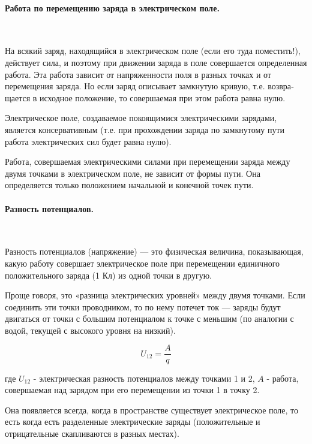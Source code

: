 \documentclass[a4paper,12pt]{article}
\begin{document}
		\paragraph{Работа по перемещению заряда в электрическом поле.} \
		
		На всякий заряд, находящийся в электрическом поле (если его туда поместить!), дей­ствует
		сила, и поэтому при движении заряда в поле совер­шается определенная работа. Эта работа 
		зависит от напря­женности поля в разных точках и от перемещения заряда. Но если заряд 
		описывает замкнутую кривую, т.е. возвра­щается в исходное положение, то совершаемая при 
		этом работа равна нулю.

		Электрическое поле, создаваемое покоящимися электрическими зарядами, является 
		консервативным (т.е. при прохождении заряда по замкнутому пути работа электрических сил
		будет равна нулю).

		Работа, совершаемая электрическими силами при перемещении заряда между двумя точками 
		в электрическом поле, не зависит от формы пути. Она определяется только положением 
		начальной и конечной точек пути.

		\paragraph{Разность потенциалов.} \

		Разность потенциалов (напряжение) — это физическая величина, показывающая, какую 
		работу совершает электрическое поле при перемещении единичного положительного 
		заряда (1 Кл) из одной точки в другую.

		Проще говоря, это «разница электрических уровней» между двумя точками. Если 
		соединить эти точки проводником, то по нему потечет ток — заряды будут двигаться 
		от точки с большим потенциалом к точке с меньшим (по аналогии с водой, текущей с 
		высокого уровня на низкий).

		\begin{equation}
			U_{12} = \frac{A}{q}
		\end{equation}

		где $U_{12}$ - электрическая разность потенциалов между точками 1 и 2, $A$ - работа,
		совершаемая над зарядом при его перемещении из точки 1 в точку 2.

		Она появляется всегда, когда в пространстве существует электрическое поле, то есть
		когда есть разделенные электрические заряды (положительные и отрицательные 
		скапливаются в разных местах). 
\end{document}
